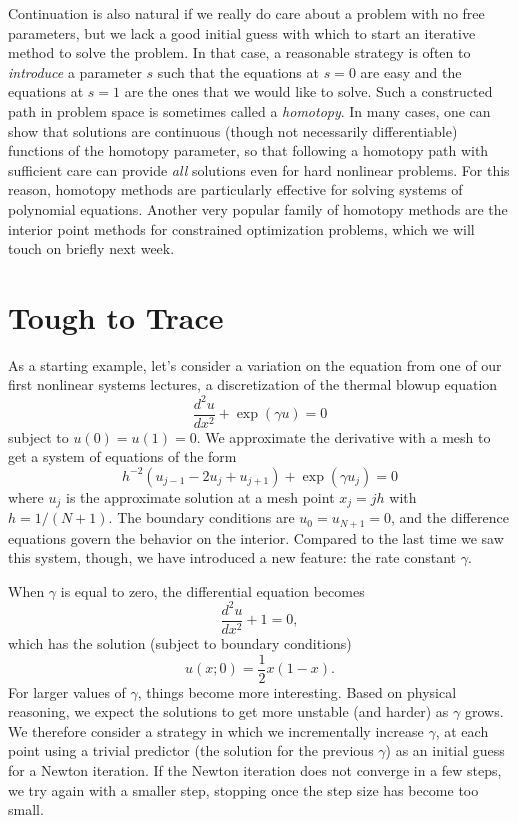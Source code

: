 \documentclass[12pt, leqno]{article} %
\begin{document}
Continuation is also natural if we really do care about a problem with no free
parameters, but we lack a good initial guess with which to start an
iterative method to solve the problem.  In that case, a reasonable
strategy is often to {\em introduce} a parameter $s$ such that the
equations at $s = 0$ are easy and the equations at $s = 1$ are the
ones that we would like to solve.  Such a constructed path in problem
space is sometimes called a {\em homotopy}.  In many cases, one can
show that solutions are continuous (though not necessarily
differentiable) functions of the homotopy parameter, so that following
a homotopy path with sufficient care can provide {\em all} solutions
even for hard nonlinear problems.  For this reason, homotopy methods
are particularly effective for solving systems of polynomial
equations.  Another very popular family of homotopy methods are the
interior point methods for constrained optimization problems,
which we will touch on briefly next week.

\section*{Tough to Trace}

As a starting example, let's consider a variation on
the equation from one of our first nonlinear systems lectures,
a discretization of the thermal blowup equation
\[
  \frac{d^2 u}{dx^2} + \exp(\gamma u) = 0
\]
subject to $u(0) = u(1) = 0$.  We approximate the derivative
with a mesh to get a system of equations of the form
\[
  h^{-2} \left( u_{j-1}-2u_j+u_{j+1} \right) + \exp(\gamma u_j) = 0
\]
where $u_j$ is the approximate solution at a mesh point $x_j = jh$
with $h = 1/(N+1)$.  The boundary conditions are $u_0 = u_{N+1} = 0$,
and the difference equations govern the behavior on the interior.
Compared to the last time we saw this system, though, we have
introduced a new feature: the rate constant $\gamma$.

When $\gamma$ is equal to zero, the differential equation becomes
\[
  \frac{d^2 u}{dx^2} + 1 = 0,
\]
which has the solution (subject to boundary conditions)
\[
  u(x; 0) = \frac{1}{2} x(1-x).
\]
For larger values of $\gamma$, things become more interesting.
Based on physical reasoning, we expect the solutions to get more
unstable (and harder) as $\gamma$ grows.  We therefore consider
a strategy in which we incrementally increase $\gamma$, at each
point using a trivial predictor (the solution for the previous
$\gamma$) as an initial guess for a Newton iteration.  If the
Newton iteration does not converge in a few steps, we try again
with a smaller step, stopping once the step size has become too small.
\end{document}
